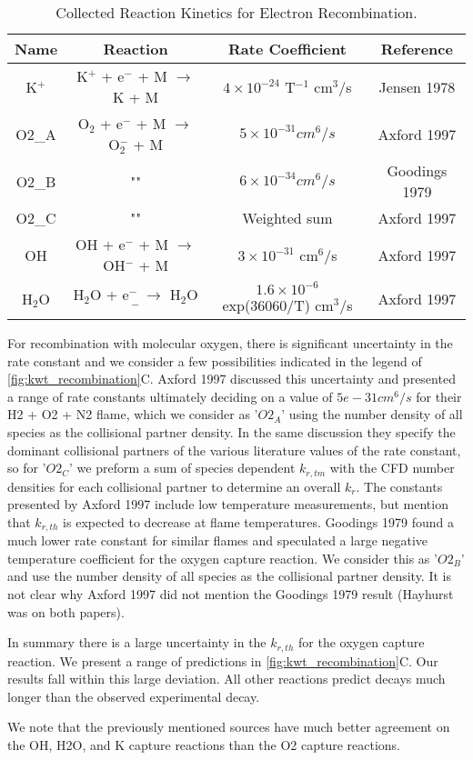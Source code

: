 \begin{table}[h]
\centering
\caption{Collected Reaction Kinetics for Electron Recombination.}
\label{tab:reactions}
\begin{tabular}{|c|c|c|c|}
\hline
Name & Reaction & Rate Coefficient & Reference \\
\hline
K$^+$ & K$^+$ + e$^-$ + M $\rightarrow$ K + M & $4 \times 10^{-24}$ T$^{-1}$ cm$^3$/s & Jensen 1978 \\
\hline
O2\_A & O$_2$ + e$^-$ + M $\rightarrow$ O$_2^-$ + M & $5 \times 10^{-31} cm^6/s$ & Axford 1997 \\
\hline
O2\_B & ""                                          & $6 \times 10^{-34} cm^6/s$ &  Goodings 1979 \\
\hline
O2\_C & ""                                          & Weighted sum  &  Axford 1997 \\
\hline
OH & OH + e$^-$ + M $\rightarrow$ OH$^-$ + M & $3 \times 10^{-31}$ cm$^6$/s & Axford 1997 \\
\hline
H$_2$O & H$_2$O + e$^-$ $\rightarrow$ H$_2$O$^-$ & $1.6 \times 10^{-6}$ exp(36060/T) cm$^3$/s & Axford 1997 \\
\hline
\end{tabular}
\end{table}

For recombination with molecular oxygen, there is significant uncertainty in the rate constant and we consider a few possibilities indicated in the legend of \ref{fig:kwt_recombination}C. Axford 1997 discussed this uncertainty and presented a range of rate constants ultimately deciding on a value of $5e-31 cm^6/s$ for their H2 + O2 + N2 flame, which we consider as '$O2_A$' using the number density of all species as the collisional partner density. In the same discussion they specify the dominant collisional partners of the various literature values of the rate constant, so for '$O2_C$' we preform a sum of species dependent $k_{r,tm}$ with the CFD number densities for each collisional partner to determine an overall $k_r$. The constants presented by Axford 1997 include low temperature measurements, but mention that $k_{r,th}$ is expected to decrease at flame temperatures. Goodings 1979 found a much lower rate constant for similar flames and speculated a large negative temperature coefficient for the oxygen capture reaction. We consider this as '$O2_B$' and use the number density of all species as the collisional partner density. It is not clear why Axford 1997 did not mention the Goodings 1979 result (Hayhurst was on both papers). 

In summary there is a large uncertainty in the $k_{r,th}$ for the oxygen capture reaction. We present a range of predictions in \ref{fig:kwt_recombination}C. Our results fall within this large deviation. All other reactions predict decays much longer than the observed experimental decay. 

We note that the previously mentioned sources have much better agreement on the OH, H2O, and K capture reactions than the O2 capture reactions. 



